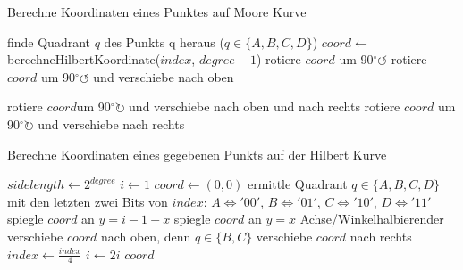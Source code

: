 \documentclass[course=erap]{aspdoc}
\begin{document}
\begin{algorithm}[h]
\scriptsize
\begin{algorithmic}
\caption{Berechne Koordinaten eines Punktes auf Moore Kurve}
\label{moore:iterative}
	\State finde Quadrant $q$ des Punkts q heraus ($q \in \{A, B, C, D\}$)
	\State $coord \leftarrow$ berechneHilbertKoordinate($index$, $degree-1$)
	 rotiere $coord$ um 90$^{\circ} \circlearrowleft$
	 rotiere $coord$ um 90$^{\circ}\circlearrowleft$ und verschiebe nach oben
		
	 rotiere $coord$um 90$^{\circ}\circlearrowright$ und verschiebe nach oben und nach rechts
	 rotiere $coord$ um  90$^{\circ} \circlearrowright$ und verschiebe nach rechts
	\EndIf
\EndFunction
{}
	\State [...]
\EndFunction
\end{algorithmic}
\end{algorithm}

\begin{algorithm}[h]
\scriptsize
\begin{algorithmic}
\caption{Berechne Koordinaten eines gegebenen Punkts auf der Hilbert Kurve}
\label{hilbert:iterative}
	\State $sidelength \leftarrow 2^{degree}$
	\State $i \leftarrow 1$
	\State $coord \leftarrow (0, 0)$
		\State ermittle Quadrant $q \in \{A, B, C, D\}$ mit den letzten zwei Bits von $index$:
		\State $A \iff '00'$, $B \iff '01'$, $C \iff '10'$, $D \iff '11'$
			\State spiegle $coord$ an $y = i-1-x$ 
			\Else 
			\State spiegle $coord$ an $y=x$ Achse/Winkelhalbierender
			\EndIf
		\Else 
		\State verschiebe $coord$ nach oben, denn $q \in \{B, C\}$
		\EndIf
		\State verschiebe $coord$ nach rechts
		\EndIf
		\State $index \leftarrow \frac{index}{4}$ 
		\State $i \leftarrow 2i$
	\EndWhile
	\State \Return $coord$
\EndFunction
\end{algorithmic}
\end{algorithm}
\end{document}
